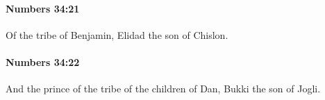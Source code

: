 		\paragraph{Numbers 34:21} %
			\label{NUMBERS-34-21}

			Of the tribe of Benjamin, Elidad the son of Chislon.


		\paragraph{Numbers 34:22} %
			\label{NUMBERS-34-22}

			And the prince of the tribe of the children of Dan, Bukki the son of Jogli.


